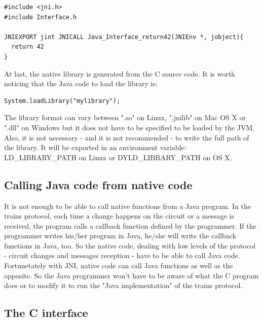 \documentclass[a4paper,10pt]{report}
\begin{document}
\lstset{language=C}
\lstset{commentstyle=\textit} 
\begin{lstlisting}
#include <jni.h>
#include Interface.h

JNIEXPORT jint JNICALL Java_Interface_return42(JNIEnv *, jobject){
  return 42
}

\end{lstlisting}

At last, the native library is generated from the C source code. It is worth noticing that the Java code to load the library is: \\
\lstset{language=java}
\lstset{commentstyle=\textit} 
\begin{lstlisting}
System.loadLibrary("mylibrary");
\end{lstlisting}

The library format can vary between ".so" on Linux, ".jnilib" on Mac OS X or ".dll" on Windows but it does not have to be specified to be loaded by the JVM.
Also, it is not necessary - and it is not recommended - to write the full path of the library. It will be exported in an environment variable: LD\_LIBRARY\_PATH on Linux or
DYLD\_LIBRARY\_PATH on OS X.

\subsection{Calling Java code from native code}

It is not enough to be able to call native functions from a Java program. In the trains protocol, each time a change happens on the circuit
or a message is received, the program calls a callback function defined by the programmer.
If the programmer writes his/her program in Java, he/she will write the callback functions in Java, too. So the native code, dealing with
low levels of the protocol - circuit changes and messages reception - have to be able to call Java code.
Fortunetately with JNI, native code can call Java functions as well as the opposite. So the Java programmer won't have to be aware of
what the C program does or to modify it to run the "Java implementation" of the trains protocol.  

\subsection{The C interface}
\end{document}
